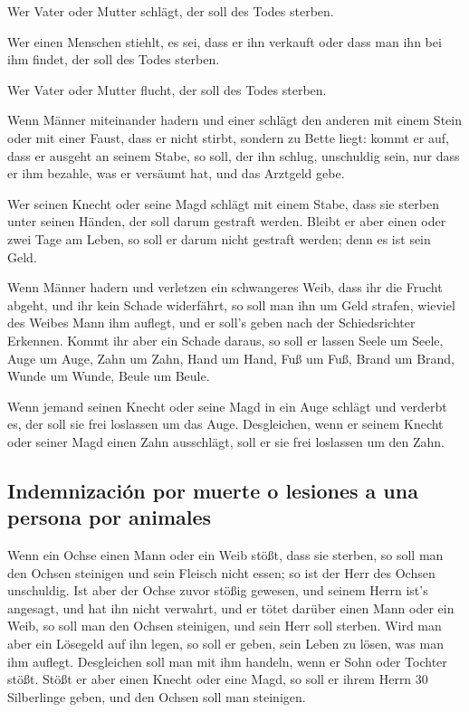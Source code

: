  Wer Vater oder Mutter schlägt, der soll des Todes
sterben.

 Wer einen Menschen stiehlt, es sei, dass er ihn verkauft
oder dass man ihn bei ihm findet, der soll des Todes sterben.

 Wer Vater oder Mutter flucht, der soll des Todes
sterben.

 Wenn Männer miteinander hadern und einer schlägt den
anderen mit einem Stein oder mit einer Faust, dass er nicht stirbt,
sondern zu Bette liegt:  kommt er auf, dass er ausgeht an
seinem Stabe, so soll, der ihn schlug, unschuldig sein, nur dass er ihm
bezahle, was er versäumt hat, und das Arztgeld gebe.

 Wer seinen Knecht oder seine Magd schlägt mit einem
Stabe, dass sie sterben unter seinen Händen, der soll darum gestraft
werden.  Bleibt er aber einen oder zwei Tage am Leben, so
soll er darum nicht gestraft werden; denn es ist sein Geld.

 Wenn Männer hadern und verletzen ein schwangeres Weib,
dass ihr die Frucht abgeht, und ihr kein Schade widerfährt, so soll man
ihn um Geld strafen, wieviel des Weibes Mann ihm auflegt, und er soll's
geben nach der Schiedsrichter Erkennen.  Kommt ihr aber
ein Schade daraus, so soll er lassen Seele um Seele, 
Auge um Auge, Zahn um Zahn, Hand um Hand, Fuß um Fuß, 
Brand um Brand, Wunde um Wunde, Beule um Beule.

 Wenn jemand seinen Knecht oder seine Magd in ein Auge
schlägt und verderbt es, der soll sie frei loslassen um das Auge.
 Desgleichen, wenn er seinem Knecht oder seiner Magd
einen Zahn ausschlägt, soll er sie frei loslassen um den Zahn.

\hypertarget{indemnizaciuxf3n-por-muerte-o-lesiones-a-una-persona-por-animales}{%
\subsection{Indemnización por muerte o lesiones a una persona por
animales}\label{indemnizaciuxf3n-por-muerte-o-lesiones-a-una-persona-por-animales}}

 Wenn ein Ochse einen Mann oder ein Weib stößt, dass sie
sterben, so soll man den Ochsen steinigen und sein Fleisch nicht essen;
so ist der Herr des Ochsen unschuldig.  Ist aber der
Ochse zuvor stößig gewesen, und seinem Herrn ist's angesagt, und hat ihn
nicht verwahrt, und er tötet darüber einen Mann oder ein Weib, so soll
man den Ochsen steinigen, und sein Herr soll sterben. 
Wird man aber ein Lösegeld auf ihn legen, so soll er geben, sein Leben
zu lösen, was man ihm auflegt.  Desgleichen soll man mit
ihm handeln, wenn er Sohn oder Tochter stößt.  Stößt er
aber einen Knecht oder eine Magd, so soll er ihrem Herrn 30 Silberlinge
geben, und den Ochsen soll man steinigen.

